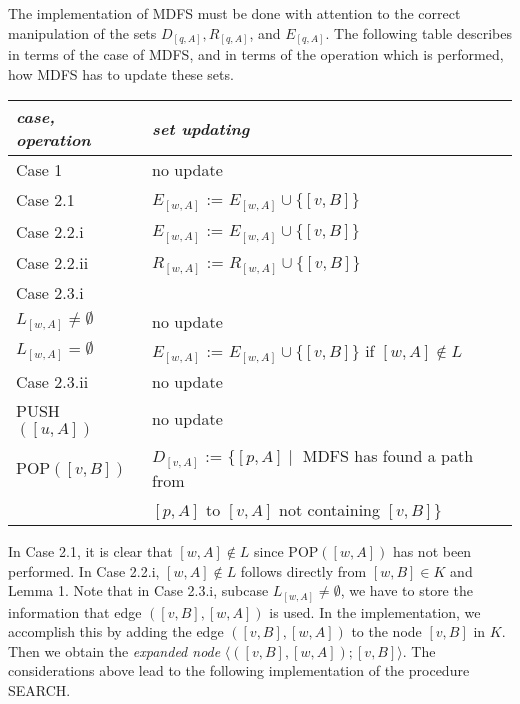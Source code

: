 \documentclass[12pt,twoside,a4paper]{article}
\begin{document}
The implementation of MDFS must be done with attention to the correct 
manipulation of the
sets $D_{[q,A]}, R_{[q,A]}$, and $E_{[q,A]}$. The following table describes in
terms of the case of MDFS, and in terms of the operation which is 
performed, how MDFS has to update these sets.
\begin{center}
\begin{tabular}{|l|l|} \hline
{\em case, operation\/}  & {\em set updating\/} \\ \hline
Case 1  &  no update \\
Case 2.1  &  $E_{[w,A]}$ := $E_{[w,A]}\cup \{[v,B]\}$  \\
Case 2.2.i  & $E_{[w,A]}$ := $E_{[w,A]} \cup \{[v,B]\}$ \\
Case 2.2.ii  &  $R_{[w,A]}$ := $R_{[w,A]}\cup \{[v,B]\}$  \\
Case 2.3.i  &                                          \\
$L_{[w,A]} \not= \emptyset$  & no update  \\
$L_{[w,A]}=\emptyset$ & $E_{[w,A]}$ := $E_{[w,A]}\cup \{[v,B]\}$ if $[w,A] 
\not\in L$ \\
Case 2.3.ii  & no update   \\
PUSH$([u,A])$ & no update \\
POP$([v,B])$  & $D_{[v,A]}$ := $\{[p,A] \mid$ MDFS has found a path from \\
  &  $[p,A]$ to $[v,A]$ not containing $[v,B] \}$  \\
\hline
\end{tabular}
\end{center}
In Case 2.1, it is clear that $[w,A] \not\in L$ since POP$([w,A])$ has not been 
performed. In Case 2.2.i, $[w,A] \not\in L$ follows directly from $[w,B] \in
K$ and Lemma 1.
Note that in Case 2.3.i, subcase $L_{[w,A]}\not= \emptyset$, we have to 
store the information that edge $([v,B],[w,A])$ is used. In the 
implementation, we accomplish this by adding the edge $([v,B],[w,A])$ to the node 
$[v,B]$ in $K$.
Then we obtain the {\em expanded node} $\langle ([v,B],[w,A]);[v,B]\rangle$.
The considerations above lead to the following implementation of the procedure
SEARCH.

\medskip
\end{document}

